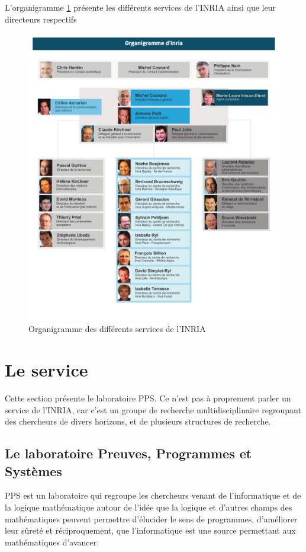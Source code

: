 \documentclass[a4paper, 11pt]{report}
\begin{document}
    L'organigramme \cref{orga} présente les différents services de l'INRIA ainsi
    que leur directeurs respectifs
    \begin{figure}
    \includegraphics[scale=0.85]{../data/organigrammeinria.pdf}
    \caption{Organigramme des différents services de l'INRIA\label{orga}}
    \end{figure}

  \section{Le service}
  Cette section présente le laboratoire PPS. Ce n'est pas à proprement parler
  un service de l'INRIA, car c'est un groupe de recherche multidisciplinaire
  regroupant des chercheurs de divers horizons, et de plusieurs structures de
  recherche.
    \subsection{Le laboratoire Preuves, Programmes  et Systèmes}
    PPS est un laboratoire qui regroupe les chercheurs venant de l'informatique
    et de la logique mathématique autour de l'idée que la logique et d'autres
    champs des mathématiques peuvent permettre d'élucider le sens de programmes,
    d'améliorer leur sûreté et réciproquement, que l'informatique est une source
    permettant aux mathématiques d'avancer.
\end{document}
